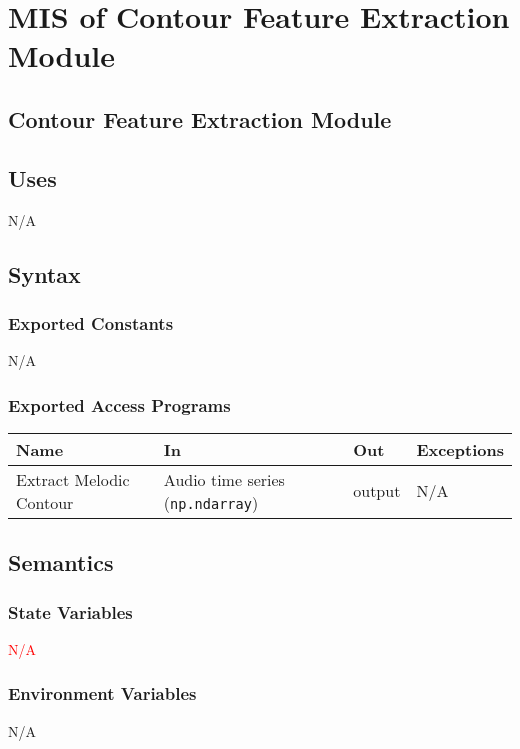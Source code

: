 \documentclass[12pt, titlepage]{article}
\begin{document}
\section{MIS of Contour Feature Extraction Module} 

\subsection{Contour Feature Extraction Module}

\subsection{Uses}
N/A

\subsection{Syntax}

\subsubsection{Exported Constants}
N/A

\subsubsection{Exported Access Programs}

\begin{center}
\begin{tabular}{p{2cm} p{4cm} p{4cm} p{2cm}}
\hline
\textbf{Name} & \textbf{In} & \textbf{Out} & \textbf{Exceptions}\\
\hline%
Extract Melodic Contour &Audio time series (\texttt{np.ndarray}) &output &N/A\\
\hline
\end{tabular}
\end{center}

\subsection{Semantics}

\subsubsection{State Variables}
\textcolor{red}{N/A}

\subsubsection{Environment Variables}
N/A
\end{document}
